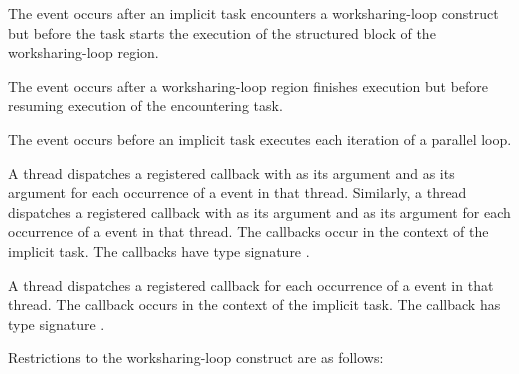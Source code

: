 \events

The  event occurs after an implicit task encounters a
worksharing-loop construct but before the task starts the execution of the structured
block of the worksharing-loop region.

The  event occurs after a worksharing-loop region finishes
execution but before resuming execution of the encountering task.

The  event occurs before an implicit task
executes each iteration of a parallel loop.

\tools

A thread dispatches a registered  callback with 
 as its  argument and  
as its  argument for each occurrence of a  
event in that thread. Similarly, a thread dispatches a registered 
 callback with  as its 
 argument and  as its  argument 
for each occurrence of a  event in that thread. The callbacks
 occur in the context of the implicit task. The callbacks have type 
signature .

A thread dispatches a registered 
callback for each occurrence of a  
event in that thread. The callback occurs in the
context of the implicit task.  The callback has type signature
. 

\restrictions
Restrictions to the worksharing-loop construct are as follows:

